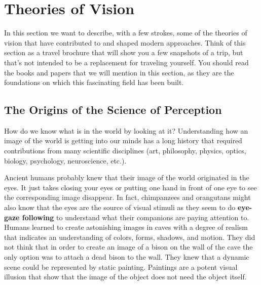 \section{Theories of Vision}


In this section we want to describe, with a few strokes, some of the theories of vision that have contributed to and shaped modern approaches. Think of this section as a travel brochure that will show you a few snapshots of a trip, but that's not intended to be a replacement for traveling yourself. You should read the books and papers that we will mention in this section, as they are the foundations on which this fascinating field has been built.



\subsection{The Origins of the Science of Perception}
%

How do we know what is in the world by looking at it? Understanding how an image of the world is getting into our minds has a long history that required contributions from many scientific disciplines (art, philosophy, physics, optics, biology, psychology, neuroscience, etc.).


Ancient humans probably knew that their image of the world originated in the eyes. It just takes closing your eyes or putting one hand in front of one eye to see the corresponding image disappear. In fact, chimpanzees and orangutans might also know that the eyes are the source of visual stimuli as they seem to do {\bf eye-gaze following} to understand what their companions  are paying attention to.
Humans learned to create astonishing images in caves with a degree of realism that indicates an understanding of colors, forms, shadows, and motion. They did not think that in order to create an image of a bison on the wall of the cave the only option was to attach a dead bison to the wall. They knew that a dynamic scene could be represented by static painting.  Paintings are a potent visual illusion that show that the image of the object does not need the object itself.

